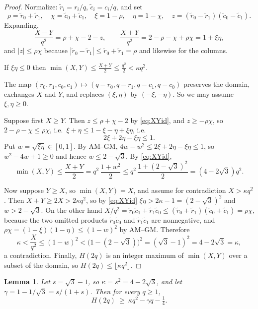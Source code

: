 \documentclass[11pt]{amsart}
\newtheorem{lemma}[theorem]{Lemma}
\theoremstyle{definition}
\theoremstyle{remark}
\begin{document}
\begin{proof}
Normalize: $\tilde r_i=r_i/q$, $\tilde c_i=c_i/q$, and set
\[
\rho=\tilde r_0+\tilde r_1,\quad \chi=\tilde c_0+\tilde c_1,\quad
\xi=1-\rho,\quad\eta=1-\chi,\quad
z=(\tilde r_0-\tilde r_1)(\tilde c_0-\tilde c_1).
\]
Expanding,
\begin{equation}\label{eq:XYid}
\frac{X-Y}{q^2}=\rho+\chi-2-z,
\qquad
\frac{X+Y}{q^2}=2-\rho-\chi+\rho\chi=1+\xi\eta ,
\end{equation}
and $|z|\le\rho\chi$ because $|\tilde r_0-\tilde r_1|\le\tilde r_0+\tilde r_1=\rho$ and likewise for the columns.

If $\xi\eta\le0$ then $\min(X,Y)\le\frac{X+Y}{2}\le\frac{q^2}{2}<\kappa q^2$.

The map $(r_0,r_1,c_0,c_1)\mapsto(q-r_0,q-r_1,q-c_1,q-c_0)$ preserves the domain, exchanges $X$ and $Y$, and replaces $(\xi,\eta)$ by $(-\xi,-\eta)$. So we may assume $\xi,\eta\ge0$.

Suppose first $X\ge Y$. Then $z\le\rho+\chi-2$ by \eqref{eq:XYid}, and $z\ge-\rho\chi$, so $2-\rho-\chi\le\rho\chi$, i.e.\ $\xi+\eta\le1-\xi-\eta+\xi\eta$, i.e.
\begin{equation}\label{eq:xieta}
2\xi+2\eta-\xi\eta\le1 .
\end{equation}
Put $w=\sqrt{\xi\eta}\in[0,1]$. By AM--GM, $4w-w^2\le2\xi+2\eta-\xi\eta\le1$, so $w^2-4w+1\ge0$ and hence $w\le2-\sqrt3$. By \eqref{eq:XYid},
\[
\min(X,Y)\le\frac{X+Y}{2}=q^2\,\frac{1+w^2}{2}\le q^2\,\frac{1+(2-\sqrt3)^2}{2}=(4-2\sqrt3)q^2 .
\]

Now suppose $Y\ge X$, so $\min(X,Y)=X$, and assume for contradiction $X>\kappa q^2$. Then $X+Y\ge2X>2\kappa q^2$, so by \eqref{eq:XYid} $\xi\eta>2\kappa-1=(2-\sqrt3)^2$ and $w>2-\sqrt3$. On the other hand $X/q^2=\tilde r_0\tilde c_1+\tilde r_1\tilde c_0\le(\tilde r_0+\tilde r_1)(\tilde c_0+\tilde c_1)=\rho\chi$, because the two omitted products $\tilde r_0\tilde c_0$ and $\tilde r_1\tilde c_1$ are nonnegative, and $\rho\chi=(1-\xi)(1-\eta)\le(1-w)^2$ by AM--GM. Therefore
\[
\kappa<\frac{X}{q^2}\le(1-w)^2<\bigl(1-(2-\sqrt3)\bigr)^2=(\sqrt3-1)^2=4-2\sqrt3=\kappa,
\]
a contradiction. Finally, $H(2q)$ is an integer maximum of $\min(X,Y)$ over a subset of the domain, so $H(2q)\le\lfloor\kappa q^2\rfloor$.
\end{proof}

\begin{lemma}\label{lem:Hlower}
Let $s=\sqrt3-1$, so $\kappa=s^2=4-2\sqrt3$, and let $\gamma=1-1/\sqrt3=s/(1+s)$. Then for every $q\ge1$,
\[
H(2q)\ \ge\ \kappa q^2-\gamma q-\tfrac14 .
\]
\end{lemma}
\end{document}
